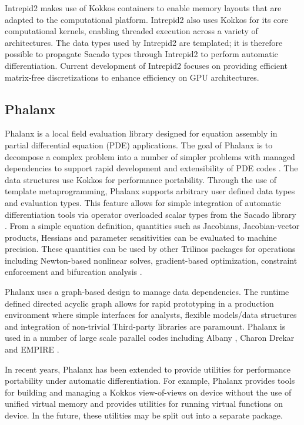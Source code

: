 Intrepid2 makes use of Kokkos containers to enable memory layouts that are adapted to the computational platform. Intrepid2 also uses Kokkos for its core computational kernels, enabling threaded execution across a variety of architectures. The data types used by Intrepid2 are templated; it is therefore possible to propagate Sacado types through Intrepid2 to perform automatic differentiation. Current development of Intrepid2 focuses on providing efficient matrix-free discretizations to enhance efficiency on GPU architectures. 

\subsection{Phalanx}
Phalanx is a local field evaluation library designed for equation assembly in partial differential equation (PDE) applications. The goal of Phalanx is to decompose a complex problem into a number of simpler problems with managed dependencies to support rapid development and extensibility of PDE codes \cite{Notz2012,pawlowski2012automating,pawlowski2012automatingpart2}. The data structures use Kokkos \cite{trott2021kokkos} for performance portability. Through the use of template metaprogramming, Phalanx supports arbitrary user defined data types and evaluation types. This feature allows for simple integration of automatic differentiation tools via operator overloaded scalar types from the Sacado library \cite{phipps2022automatic}. From a simple equation definition, quantities such as Jacobians, Jacobian-vector products, Hessians and parameter sensitivities can be evaluated to machine precision. These quantities can be used by other Trilinos packages for operations including Newton-based nonlinear solves, gradient-based optimization, constraint enforcement and bifurcation analysis \cite{pawlowski2012automating,pawlowski2012automatingpart2}.

Phalanx uses a graph-based design to manage data dependencies. The runtime defined directed acyclic graph allows for rapid prototyping in a production environment where simple interfaces for analysts, flexible models/data structures and integration of non-trivial Third-party libraries are paramount. Phalanx is used in a number of large scale parallel codes including Albany \cite{Salinger2016}, Charon \cite{CharonUsersManual2020} Drekar \cite{Crockatt2022,Miller2019,Shadid2016mhd} and EMPIRE \cite{BettencourtBrownEtAl2021_EmpirePic}.

In recent years, Phalanx has been extended to provide utilities for performance portability under automatic differentiation. For example, Phalanx provides tools for building and managing a Kokkos view-of-views on device without the use of unified virtual memory and provides utilities for running virtual functions on device. In the future, these utilities may be split out into a separate package.

